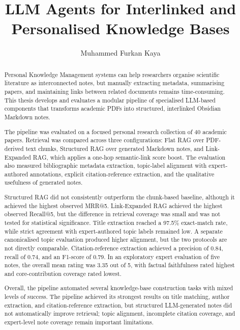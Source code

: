 \documentclass[runningheads]{llncs}
\begin{document}
\raggedbottom %
%
\title{LLM Agents for Interlinked and Personalised Knowledge Bases}
%
%
\author{Muhammed Furkan Kaya}
%
%
%
\maketitle              %
%
\begin{abstract}

Personal Knowledge Management systems can help researchers organise
scientific literature as interconnected notes, but manually extracting
metadata, summarising papers, and maintaining links between related
documents remains time-consuming. This thesis develops and evaluates a
modular pipeline of specialised LLM-based components that transforms
academic PDFs into structured, interlinked Obsidian Markdown notes.

The pipeline was evaluated on a focused personal research collection of
40 academic papers. Retrieval was compared across three configurations:
Flat RAG over PDF-derived text chunks, Structured RAG over generated
Markdown notes, and Link-Expanded RAG, which applies a one-hop
semantic-link score boost. The evaluation also measured bibliographic
metadata extraction, topic-label alignment with expert-authored
annotations, explicit citation-reference extraction, and the qualitative
usefulness of generated notes.

Structured RAG did not consistently outperform the chunk-based baseline,
although it achieved the highest observed MRR@5. Link-Expanded RAG achieved the highest observed Recall@5, but the
difference in retrieval coverage was small and was not tested for
statistical significance. Title extraction reached a 97.5\% exact-match rate,
while strict agreement with expert-authored topic labels remained low. A
separate canonicalised topic evaluation produced higher alignment, but
the two protocols are not directly comparable. Citation-reference extraction achieved a precision of 0.84, recall of
0.74, and an F1-score of 0.79. In
an exploratory expert evaluation of five notes, the overall mean rating
was 3.35 out of 5, with factual faithfulness rated highest and
core-contribution coverage rated lowest.

Overall, the pipeline automated several knowledge-base construction
tasks with mixed levels of success. The pipeline achieved its strongest results on title matching, author
extraction, and citation-reference extraction, but structured
LLM-generated notes did not automatically improve retrieval; topic
alignment, incomplete citation coverage, and expert-level note coverage
remain important limitations.

\end{abstract}
%
%
%
\end{document}

